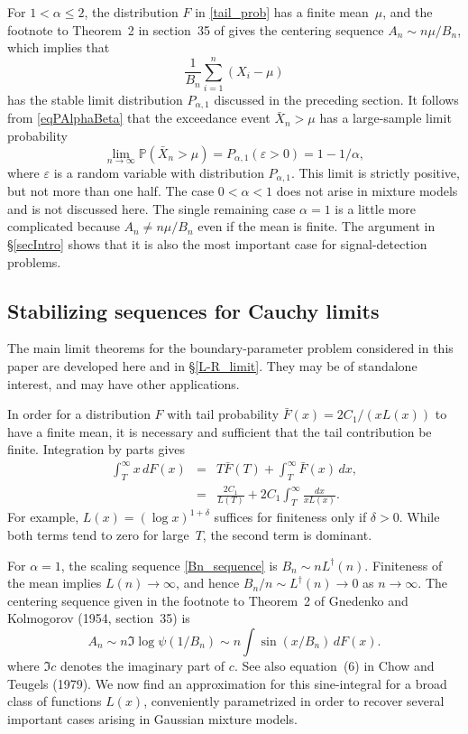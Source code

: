 \documentclass[11pt]{article}
\theoremstyle{definition}
\def\Prob{{\mathbb P}}
\begin{document}
For $1 < \alpha \le 2$, the distribution $F$ in \eqref{tail_prob} has a finite mean~$\mu$, 
and the footnote to Theorem~2 in section~35 of \citet{GK1954} gives the centering sequence $A_n \sim n \mu/B_n$, which implies that
\[
\frac 1 {B_n} \sum_{i=1}^n  (X_i - \mu)
\]
has the stable limit distribution $P_{\alpha, 1}$ discussed in the preceding section.
It follows from \eqref{eqPAlphaBeta} that the exceedance event $\bar X_n > \mu$ has a large-sample limit probability
\begin{equation}\label{alpha_limit_prob}
\lim_{n\to\infty} \Prob(\bar X_n > \mu) = P_{\alpha, 1}(\varepsilon > 0) = 1 - 1/\alpha,
\end{equation}
%
where $\varepsilon$ is a random variable with distribution $P_{\alpha, 1}$. This limit is strictly positive, but not more than one half. The case $0 <\alpha < 1$ does not arise in mixture models and is not discussed here. The single remaining case $\alpha=1$ is a little more complicated because $A_n \neq n\mu/B_n$ even if the mean is finite.
The argument in \S\ref{secIntro} shows that it is also the most important case for signal-detection problems.

\subsection{Stabilizing sequences for Cauchy limits}\label{secCauchy}



The main limit theorems for the boundary-parameter problem considered in this paper are developed here and in \S \ref{L-R_limit}. They may be of standalone interest, and may have other applications. 


In order for a distribution $F$ with tail probability $\bar F(x) = 2C_1/(xL(x))$ to have a finite mean, it is necessary and sufficient that the tail contribution be finite.
Integration by parts gives
\begin{eqnarray*}
	\int_T^\infty x \, dF(x) &=& T \bar F(T) + \int_T^\infty \bar F(x)\, dx , \\
	&=& \frac {2C_1} {L(T)} + 2C_1 \int_T^\infty \frac{dx} {x L(x)}.
\end{eqnarray*}
For example, $L(x) = (\log x)^{1+\delta}$ suffices for finiteness
only if $\delta > 0$.
While both terms tend to zero for large~$T$, the second term is dominant.

For $\alpha=1$, the scaling sequence \eqref{Bn_sequence} is $B_n \sim n L^\dagger(n)$. Finiteness of the mean implies $L(n) \to \infty$, and hence $B_n/n \sim L^\dagger(n)\to 0$ as $n\to\infty$.
The centering sequence given in the footnote to Theorem~2 of Gnedenko and Kolmogorov (1954, section~35) is
%
\begin{equation}\label{eqAn}
A_n \sim n \Im \log \psi(1/B_n) \sim n \int \sin(x/B_n) \, dF(x).
\end{equation}
where $\Im c$ denotes the imaginary part of $c$. See also equation~(6) in Chow and Teugels (1979). We now find an approximation for this sine-integral for a broad class of functions $L(x)$, conveniently parametrized in order to recover several important cases arising in Gaussian mixture models.
\end{document}
